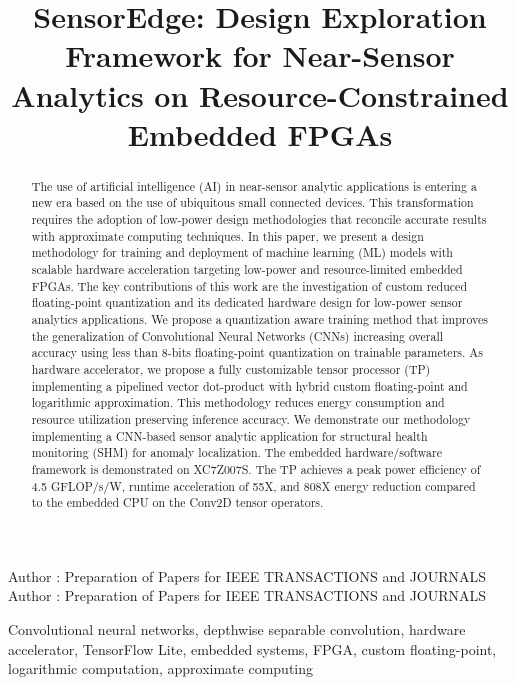 \title {SensorEdge: Design Exploration Framework for Near-Sensor Analytics on Resource-Constrained Embedded FPGAs}



\markboth
{Author \headeretal: Preparation of Papers for IEEE TRANSACTIONS and JOURNALS}
{Author \headeretal: Preparation of Papers for IEEE TRANSACTIONS and JOURNALS}


\begin{abstract}
The use of artificial intelligence (AI) in near-sensor analytic applications is entering a new era based on the use of ubiquitous small connected devices. This transformation requires the adoption of low-power design methodologies that reconcile accurate results with approximate computing techniques. In this paper, we present a design methodology for training and deployment of machine learning (ML) models with scalable hardware acceleration targeting low-power and resource-limited embedded FPGAs. The key contributions of this work are the investigation of custom reduced floating-point quantization and its dedicated hardware design for low-power sensor analytics applications. We propose a quantization aware training method that improves the generalization of Convolutional Neural Networks (CNNs) increasing overall accuracy using less than 8-bits floating-point quantization on trainable parameters. As hardware accelerator, we propose a fully customizable tensor processor (TP) implementing a pipelined vector dot-product with hybrid custom floating-point and logarithmic approximation. This methodology reduces energy consumption and resource utilization preserving inference accuracy. We demonstrate our methodology implementing a CNN-based sensor analytic application for structural health monitoring (SHM) for anomaly localization. The embedded hardware/software framework is demonstrated on XC7Z007S. The TP achieves a peak power efficiency of 4.5 GFLOP/s/W, runtime acceleration of 55X, and 808X energy reduction compared to the embedded CPU on the Conv2D tensor operators.
\end{abstract}

\begin{keywords}
Convolutional neural networks, depthwise separable convolution, hardware accelerator, TensorFlow Lite, embedded systems, FPGA, custom floating-point, logarithmic computation, approximate computing
\end{keywords}

\titlepgskip=-15pt

\maketitle